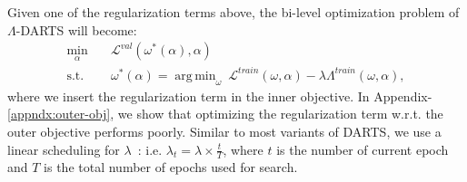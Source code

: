 \documentclass{article} \usepackage{fancyhdr, iclr2023_conference, times}
\DeclareMathOperator*{\argmin}{arg\,min}
\newcommand{\mydarts}{$\Lambda$-DARTS\xspace}
\begin{document}
\par Given one of the regularization terms above, the bi-level optimization problem of \mydarts will become:
\begin{equation}
    \begin{aligned}
        \min_\alpha \quad & \mathcal{L}^{val} (\omega^*(\alpha), \alpha)
        \\\textrm{s.t.} \quad&\omega^*(\alpha)=\argmin_\omega~\mathcal{L}^{train} (\omega, \alpha) - \lambda \Lambda^{train}(\omega, \alpha),
    \end{aligned}
\end{equation}
where we insert the regularization term in the inner objective. In Appendix-\ref{appndx:outer-obj}, we show that optimizing the regularization term w.r.t. the outer objective performs poorly.
Similar to most variants of DARTS, we use a linear scheduling for $\lambda$~\citep{DBLP:conf/iclr/ZelaESMBH20, DBLP:conf/icml/ChenH20}: i.e. $\lambda_t=\lambda \times \frac{t}{T}$, where $t$ is the number of current epoch and $T$ is the total number of epochs used for search.
\end{document}
